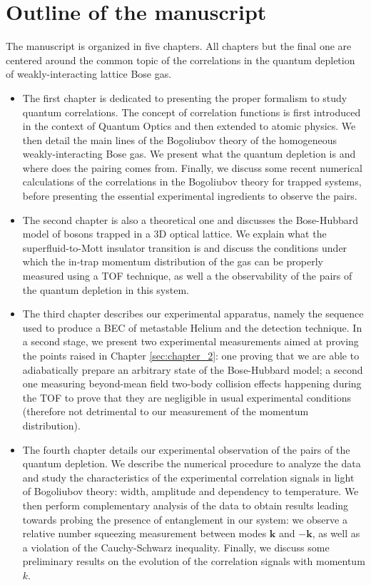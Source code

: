 \section*{Outline of the manuscript}

The manuscript is organized in five chapters. All chapters but the final one are centered around the common topic of the \kmk correlations in the quantum depletion of weakly-interacting lattice Bose gas.

\begin{itemize}
    \item The first chapter is dedicated to presenting the proper formalism to study quantum correlations. The concept of correlation functions is first introduced in the context of Quantum Optics and then extended to atomic physics. We then detail the main lines of the Bogoliubov theory of the homogeneous weakly-interacting Bose gas. We present what the quantum depletion is and where does the \kmk pairing comes from. Finally, we discuss some recent numerical calculations \cite{butera2020} of the correlations in the Bogoliubov theory for trapped systems, before presenting the essential experimental ingredients to observe the \kmk pairs.
    \item The second chapter is also a theoretical one and discusses the Bose-Hubbard model of bosons trapped in a 3D optical lattice. We explain what the superfluid-to-Mott insulator transition is and discuss the conditions under which the in-trap momentum distribution of the gas can be properly measured using a TOF technique, as well a the observability of the \kmk pairs of the quantum depletion in this system.
    \item The third chapter describes our experimental apparatus, namely the sequence used to produce a BEC of metastable Helium and the detection technique. In a second stage, we present two experimental measurements aimed at proving the points raised in Chapter \ref{sec:chapter_2}: one proving that we are able to adiabatically prepare an arbitrary state of the Bose-Hubbard model; a second one measuring beyond-mean field two-body collision effects happening during the TOF to prove that they are negligible in usual experimental conditions (therefore not detrimental to our measurement of the momentum distribution). 
    \item The fourth chapter details our experimental observation of the \kmk pairs of the quantum depletion. We describe the numerical procedure to analyze the data and study the characteristics of the experimental correlation signals in light of Bogoliubov theory: width, amplitude and dependency to temperature. We then perform complementary analysis of the data to obtain results leading towards probing the presence of entanglement in our system: we observe a relative number squeezing measurement between modes $\bm{k}$ and $-\bm{k}$, as well as a violation of the Cauchy-Schwarz inequality. Finally, we discuss some preliminary results on the evolution of the correlation signals with momentum $k$.

\end{itemize}
